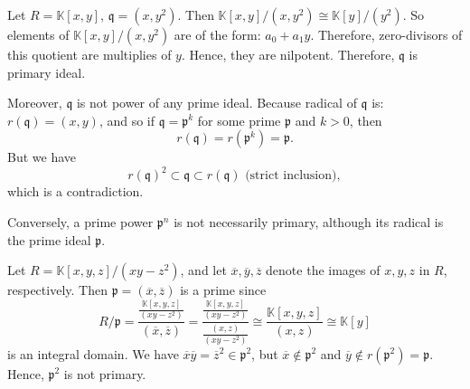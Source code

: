 \begin{example}
    Let \( R = \mathbb{K}[x,y] \),  \( \mathfrak{q} = (x, y^2) \). Then \( \mathbb{K}[x, y] / (x, y^2) \cong \mathbb{K}[y] / (y^2) \). So elements of  \( \mathbb{K}[x,y] / (x, y^2) \) are of the form:  \( a_0 + a_1y \). Therefore, zero-divisors of this quotient are multiplies of \( y \). Hence, they are nilpotent. Therefore, \( \mathfrak{q} \) is primary ideal.

    Moreover, \( \mathfrak{q} \) is not power of any prime ideal. Because radical of \( \mathfrak{q} \) is: \( r(\mathfrak{q}) = (x, y)\), and so if \( \mathfrak{q} = \mathfrak{p}^k \) for some prime \( \mathfrak{p} \) and \( k > 0 \), then 
     \[
    r(\mathfrak{q}) = r(\mathfrak{p}^k) = \mathfrak{p}.
    \]
    But we have 
    \[
        r(\mathfrak{q})^2 \subset \mathfrak{q} \subset r(\mathfrak{q}) \text{ (strict inclusion)},
    \]
    which is a contradiction.
\end{example}
Conversely, a prime power \( \mathfrak{p}^n \) is not necessarily primary, although its radical is the prime ideal \( \mathfrak{p} \). 
\begin{example}\label{ex:counterPrimary1}
    Let \( R = \mathbb{K}[x, y, z] / (xy - z^2) \), and let \( \overline{x}, \overline{y}, \overline{z} \) denote the images of \( x, y, z \) in  \( R \), respectively. Then  \( \mathfrak{p} = (\overline{x}, \overline{z}) \) is a prime since 
    \[ R / \mathfrak{p} = \frac{\frac{\mathbb{K}[x, y, z]}{(xy - z^2)}}{(\overline{x}, \overline{z})} = \frac{\frac{\mathbb{K}[x, y, z]}{(xy - z^2)}}{\frac{(x, z)}{(xy - z^2)}} \cong \frac{\mathbb{K}[x, y, z]}{(x, z)} \cong \mathbb{K}[y]\] 
is an integral domain. We have \( \overline{x}\overline{y} = \overline{z}^2 \in \mathfrak{p}^2\), but \( \overline{x} \not\in \mathfrak{p}^2 \) and \( \overline{y} \not\in r(\mathfrak{p}^2) = \mathfrak{p} \). Hence, \( \mathfrak{p}^2 \) is not primary. 
\end{example}

